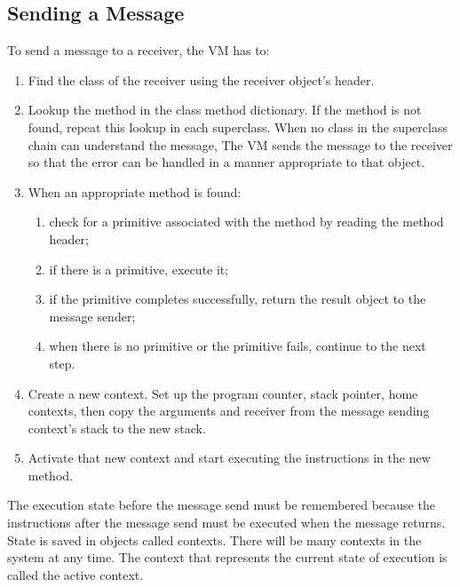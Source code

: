 \documentclass[a4paper,10pt,twoside]{book}
\begin{document}
\subsection{Sending a Message}

To send a message to a receiver, the VM has to:

\begin{enumerate}

\item Find the class of the receiver using the receiver object's
  header.

\item Lookup the method in the class method dictionary. If the method
  is not found, repeat this lookup in each superclass. When no class
  in the superclass chain can understand the message, The VM sends the
  message  to the receiver so that the error
  can be handled in a manner appropriate to that object.

\item When an appropriate method is found:

  \begin{enumerate}
  \item check for a primitive associated with the method by reading
    the method header;
  \item if there is a primitive, execute it;
  \item if the primitive completes successfully, return the result object
    to the message sender;
  \item when there is no primitive or the primitive fails, continue to
    the next step.
  \end{enumerate}

\item Create a new context. Set up the program counter, stack pointer,
  home contexts, then copy the arguments and receiver from the message
  sending context's stack to the new stack.

\item Activate that new context and start executing the instructions
  in the new method.
\end{enumerate}

The execution state before the message send must be remembered because
the instructions after the message send must be executed when the
message returns. State is saved in objects called contexts. There will
be many contexts in the system at any time. The context that
represents the current state of execution is called the active
context.
\end{document}
